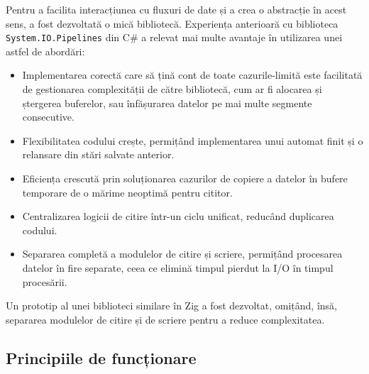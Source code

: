 \documentclass[a4paper,12pt]{report}
\begin{document}
Pentru a facilita interacțiunea cu fluxuri de date și a crea o abstracție în acest sens,
a fost dezvoltată o mică bibliotecă.
Experiența anterioară cu biblioteca \texttt{System.IO.Pipelines}\cite{system_io_pipelines}
din C\# a relevat mai multe avantaje în utilizarea unei astfel de abordări:
\begin{itemize}
  \item
  Implementarea corectă care să țină cont de toate cazurile-limită
  este facilitată de gestionarea complexității de către
  bibliotecă, cum ar fi alocarea și ștergerea buferelor,
  sau înfășurarea datelor pe mai multe segmente consecutive.

  \item
  Flexibilitatea codului crește, permițând implementarea unui automat finit
  și o relansare din stări salvate anterior.

  \item
  Eficiența crescută prin soluționarea cazurilor de copiere a datelor în bufere temporare
  de o mărime neoptimă pentru cititor.

  \item
  Centralizarea logicii de citire într-un ciclu unificat,
  reducând duplicarea codului.

  \item
  Separarea completă a modulelor de citire și scriere,
  permițând procesarea datelor în fire separate,
  ceea ce elimină timpul pierdut la \ac{I/O} în timpul procesării.
\end{itemize}

Un prototip al unei biblioteci similare în Zig a fost dezvoltat,
omițând, însă, separarea modulelor de citire și de scriere pentru a reduce complexitatea.

\subsection{Principiile de funcționare}
\end{document}

